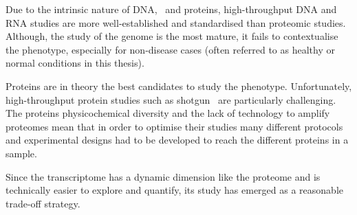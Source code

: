 Due to the intrinsic nature of \gls{DNA}, \mRNAs\ and proteins,
high-throughput \gls{DNA} and \gls{RNA} studies are more well-established
and standardised than proteomic studies.
Although, the study of the genome is the most mature,
it fails to contextualise the phenotype,
especially for non-disease cases
(often referred to as healthy or normal conditions in this thesis).\mybr\

Proteins are in theory the best candidates to study the phenotype.
Unfortunately, high-throughput protein studies
such as shotgun \ms\ are particularly challenging.
The proteins physicochemical diversity and
the lack of technology to amplify proteomes mean that
in order to optimise their studies many different protocols and experimental designs
had to be developed to reach the different proteins in a sample.\mybr\

Since the transcriptome has a dynamic dimension like the proteome
and is technically easier to explore and quantify,
its study has emerged as a reasonable trade-off strategy.\mybr\

